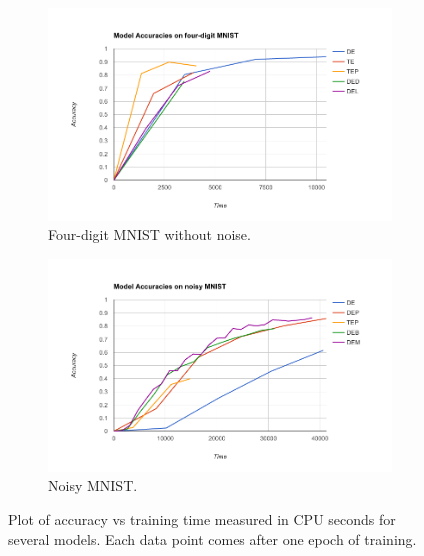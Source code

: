 
\begin{figure}
    \centering
    \begin{subfigure}[c]{1.0\textwidth}
        \centering    \includegraphics[scale=0.5]{resources/mnist_4_graph.png}
        \caption{Four-digit MNIST without noise.}
        \label{fig:mnist_early_models}
    \end{subfigure}
    \begin{subfigure}[c]{1.0\textwidth}
        \centering
        \includegraphics[scale=0.5]{resources/model_experiments.png}
        \caption{Noisy MNIST.}
        \label{fig:mnist_models}
    \end{subfigure}
    \caption{Plot of accuracy vs training time measured in CPU seconds for several models. Each data point comes after one epoch of training.}
\end{figure}
